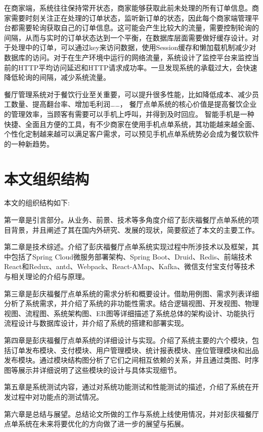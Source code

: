 在商家端，系统往往保持常开状态，商家能够获取此前未处理的所有订单信息。商家需要时刻关注正在处理的订单状态，监听新订单的状态，因此每个商家端管理平台都需要轮询获取自己的订单信息。这可能会产生比较大的流量，需要控制轮询的间隔，从而与实时的订单状态达到一个平衡，在数据库层面需要做好缓存设计。对于处理中的订单，可以通过key来访问数据，使用Session缓存和懒加载机制减少对数据库的访问。对于在生产环境中运行的网络流量，系统设计了监控平台来监控当前的HTTP平均访问延迟和HTTP请求成功率。一旦发现系统的承载过大，会快速降低轮询的间隔，减少系统流量。 

餐厅管理系统对于餐饮行业至关重要，可以提升很多性能，比如降低成本、减少员工数量、提高翻台率、增加毛利润……，
餐厅点单系统的核心价值是提高餐饮企业的管理效率，当顾客有需要可以手机上呼叫，并得到及时回应。
智能手机是一种快捷、全面且方便的工具，有不少商家在使用手机点单系统，其功能越来越全面、个性化定制越来越可以满足客户需求，可以预见手机点单系统势必会成为餐饮软件的一种新趋势。
\section{本文组织结构}
本文的组织结构如下:

第一章是引言部分。从业务、前景、技术等多角度介绍了彭庆福餐厅点单系统的项目背景，并且阐述了其在国内外研究、发展的现状，简要叙述了本文的主要工作。

第二章是技术综述。介绍了彭庆福餐厅点单系统实现过程中所涉技术以及框架，其中包括了Spring Cloud微服务部署架构、Spring Boot、Druid、Redis、前端技术React和Redux、antd、Webpack、React-AMap、Kafka、微信支付宝支付等技术与相关理论的介绍与原理。 

第三章是彭庆福餐厅点单系统的需求分析和概要设计。借助用例图、需求列表详细分析了系统需求，并介绍了系统的非功能性需求。结合逻辑视图、开发视图、物理视图、流程图、系统架构图、ER图等详细描述了系统总体的架构设计、功能执行流程设计与数据库设计，并介绍了系统的搭建和部署实现。 

第四章是彭庆福餐厅点单系统的详细设计与实现。介绍了系统主要的六个模块，包括订单发布模块、支付模块、用户管理模块、统计报表模块、座位管理模块和出品发布模块。通过模块结构图分析了它们之间相互依赖的关系，并且通过类图、时序图等展示并详细说明了这些模块的设计与具体实现细节。

第五章是系统测试内容，通过对系统功能测试和性能测试的描述，介绍了系统在开发过程中对功能点的测试情况。 

第六章是总结与展望。总结论文所做的工作与系统上线使用情况，并对彭庆福餐厅点单系统在未来将要优化的方向做了进一步的展望与拓展。



